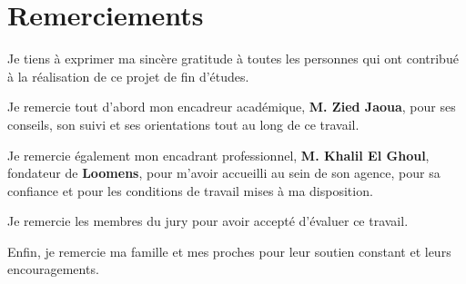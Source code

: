 \chapter*{Remerciements}

Je tiens à exprimer ma sincère gratitude à toutes les personnes qui ont contribué à la réalisation de ce projet de fin d'études.

Je remercie tout d'abord mon encadreur académique, \textbf{M. Zied Jaoua}, pour ses conseils, son suivi et ses orientations tout au long de ce travail.

Je remercie également mon encadrant professionnel, \textbf{M. Khalil El Ghoul}, fondateur de \textbf{Loomens}, pour m'avoir accueilli au sein de son agence, pour sa confiance et pour les conditions de travail mises à ma disposition.

Je remercie les membres du jury pour avoir accepté d'évaluer ce travail.

Enfin, je remercie ma famille et mes proches pour leur soutien constant et leurs encouragements.

\newpage
